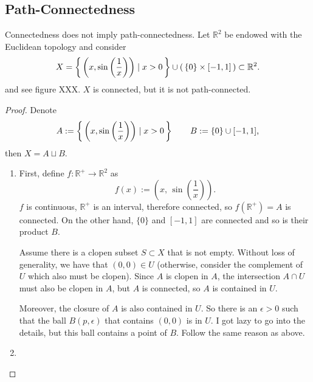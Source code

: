 \subsection{Path-Connectedness}
\begin{example}
    Connectedness does not imply path-connectedness. Let \(\mathbb{R}^2\) be endowed with the Euclidean topology and consider 
    \begin{equation*}
        X = \left\{\, \left(x, \sin\left(\frac{1}{x}\right)\right) \mid x > 0 \,\right\} \cup \left(\,\{0\} \times [-1, 1]\,\right) \subset \mathbb{R}^2 \text{.}
    \end{equation*}
    and see figure XXX. \(X\) is connected, but it is not path-connected.
\end{example}
\begin{proof}
    Denote
    \begin{equation*}
        A := \left\{\, \left(x, \sin\left(\frac{1}{x}\right)\right) \mid x > 0 \,\right\} \qquad B := \{0\} \cup [-1, 1] \text{,}
    \end{equation*}
    then \(X = A \sqcup B\).
    \begin{enumerate}
        \item First, define \(f: \mathbb{R}^+ \longrightarrow \mathbb{R}^2\) as
        \begin{equation*}
            f(x) := \left(x,\, \sin\left(\frac{1}{x}\right)\right) \text{.}
        \end{equation*}
        \(f\) is continuous, \(\mathbb{R}^+\) is an interval, therefore connected, so \(f(\mathbb{R}^+) = A\) is connected. On the other hand, \(\{0\}\) and \([-1, 1]\) are connected and so is their product \(B\).
        
        Assume there is a clopen subset \(S \subset X\) that is not empty. Without loss of generality, we have that \((0, 0) \in U\) (otherwise, consider the complement of \(U\) which also must be clopen). Since \(A\) is clopen in \(A\), the intersection \(A \cap U\) must also be clopen in \(A\), but \(A\) is connected, so \(A\) is contained in \(U\).

        Moreover, the closure of \(A\) is also contained in \(U\). So there is an \(\epsilon > 0\) such that the ball \(B(p, \epsilon)\) that contains \((0, 0)\) is in \(U\). I got lazy to go into the details, but this ball contains a point of \(B\). Follow the same reason as above.
        \item 
    \end{enumerate}
\end{proof}